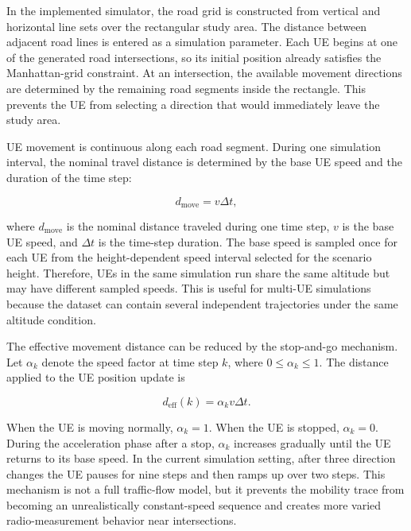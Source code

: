 In the implemented simulator, the road grid is constructed from vertical and horizontal line sets over the rectangular study area. The distance between adjacent road lines is entered as a simulation parameter. Each UE begins at one of the generated road intersections, so its initial position already satisfies the Manhattan-grid constraint. At an intersection, the available movement directions are determined by the remaining road segments inside the rectangle. This prevents the UE from selecting a direction that would immediately leave the study area.

UE movement is continuous along each road segment. During one simulation interval, the nominal travel distance is determined by the base UE speed and the duration of the time step:

\begin{equation}
    d_{\mathrm{move}} = v \Delta t,
\end{equation}

where \(d_{\mathrm{move}}\) is the nominal distance traveled during one time step, \(v\) is the base UE speed, and \(\Delta t\) is the time-step duration. The base speed is sampled once for each UE from the height-dependent speed interval selected for the scenario height. Therefore, UEs in the same simulation run share the same altitude but may have different sampled speeds. This is useful for multi-UE simulations because the dataset can contain several independent trajectories under the same altitude condition.

The effective movement distance can be reduced by the stop-and-go mechanism. Let \(\alpha_k\) denote the speed factor at time step \(k\), where \(0\le\alpha_k\le1\). The distance applied to the UE position update is

\begin{equation}
    d_{\mathrm{eff}}(k)=\alpha_k v\Delta t.
\end{equation}

When the UE is moving normally, \(\alpha_k=1\). When the UE is stopped, \(\alpha_k=0\). During the acceleration phase after a stop, \(\alpha_k\) increases gradually until the UE returns to its base speed. In the current simulation setting, after three direction changes the UE pauses for nine steps and then ramps up over two steps. This mechanism is not a full traffic-flow model, but it prevents the mobility trace from becoming an unrealistically constant-speed sequence and creates more varied radio-measurement behavior near intersections.

